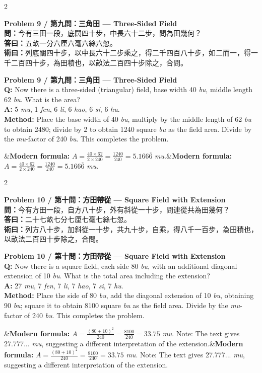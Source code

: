 \documentclass[11pt,a4paper]{article}
\newcommand{\bilingualproblem}[4]{%
  \begin{paracol}{2}
  \begin{leftcolumn}
  \noindent\textbf{\color{problemcolor}#1}\\[0.2cm]
  #2
  \end{leftcolumn}
  \switchcolumn
  \noindent\textbf{\color{problemcolor}#1}\\[0.2cm]
  #3
  \end{paracol}
  \ifx&#4&\else\vspace{0.3cm}\noindent#4\fi
  \vspace{0.5cm}
}
\newcommand{\wen}[1]{\textcolor{problemcolor}{\textbf{問：}}#1}
\newcommand{\da}[1]{\textcolor{answercolor}{\textbf{答曰：}}#1}
\newcommand{\shu}[1]{\textcolor{methodcolor}{\textbf{術曰：}}#1}
\newcommand{\wenen}[1]{\textcolor{problemcolor}{\textbf{Q:}} #1}
\newcommand{\daen}[1]{\textcolor{answercolor}{\textbf{A:}} #1}
\newcommand{\shuen}[1]{\textcolor{methodcolor}{\textbf{Method:}} #1}
\begin{document}
\bilingualproblem{Problem 9 / 第九問：三角田 --- Three-Sided Field}{
\wen{今有三田一段，底闊四十步，中長六十二步，問為田幾何？}\\[0.2cm]
\da{五畝一分六厘六毫六絲六忽。}\\[0.2cm]
\shu{列底闊四十步，以中長六十二步乘之，得二千四百八十步，如二而一，得一千二百四十步，為田積也，以畝法二百四十步除之，合問。}
}{
\wenen{Now there is a three-sided (triangular) field, base width 40 \textit{bu}, middle length 62 \textit{bu}. What is the area?}\\[0.2cm]
\daen{5 \textit{mu}, 1 \textit{fen}, 6 \textit{li}, 6 \textit{hao}, 6 \textit{si}, 6 \textit{hu}.}\\[0.2cm]
\shuen{Place the base width of 40 \textit{bu}, multiply by the middle length of 62 \textit{bu} to obtain 2480; divide by 2 to obtain 1240 square \textit{bu} as the field area. Divide by the \textit{mu}-factor of 240 \textit{bu}. This completes the problem.}
}{\textbf{Modern formula:} $A = \frac{40 \times 62}{2 \times 240} = \frac{1240}{240} = 5.166\overline{6}$ \textit{mu}.}

\bilingualproblem{Problem 10 / 第十問：方田帶從 --- Square Field with Extension}{
\wen{今有方田一段，自方八十步，外有斜從一十步，問連從共為田幾何？}\\[0.2cm]
\da{二十七畝七分七厘七毫七絲七忽。}\\[0.2cm]
\shu{列方八十步，加斜從一十步，共九十步，自乘，得八千一百步，為田積也，以畝法二百四十步除之，合問。}
}{
\wenen{Now there is a square field, each side 80 \textit{bu}, with an additional diagonal extension of 10 \textit{bu}. What is the total area including the extension?}\\[0.2cm]
\daen{27 \textit{mu}, 7 \textit{fen}, 7 \textit{li}, 7 \textit{hao}, 7 \textit{si}, 7 \textit{hu}.}\\[0.2cm]
\shuen{Place the side of 80 \textit{bu}, add the diagonal extension of 10 \textit{bu}, obtaining 90 \textit{bu}; square it to obtain 8100 square \textit{bu} as the field area. Divide by the \textit{mu}-factor of 240 \textit{bu}. This completes the problem.}
}{\textbf{Modern formula:} $A = \frac{(80+10)^2}{240} = \frac{8100}{240} = 33.75$ \textit{mu}. Note: The text gives 27.777... \textit{mu}, suggesting a different interpretation of the extension.}
\end{document}

